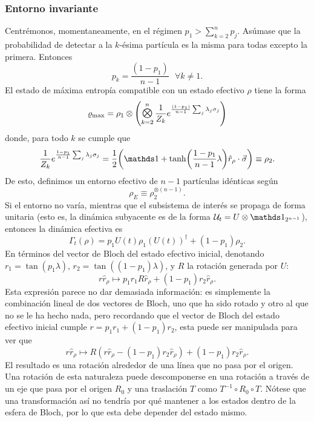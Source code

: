 \subsubsection{Entorno invariante}

Centrémonos, momentaneamente, en el régimen $p_{1}>\sum_{k=2}^{n}p_{j}$. Asúmase que la probabilidad de detectar a la $k$-ésima partícula es la misma para todas excepto la primera. Entonces
\begin{equation*}
    p_{k}=\frac{(1-p_{1})}{n-1}\text{ }\forall k\neq 1.
\end{equation*}
El estado de máxima entropía compatible con un estado efectivo $\rho$ tiene la forma
\begin{equation*}
    \varrho_{\max}=\rho_{1}\otimes\qty(\Motimes_{k=2}^{n}\frac{1}{Z_{k}}e^{\frac{(1-p_{1})}{n-1}\sum_{j}\lambda_{j}\pauli{j}})
\end{equation*}
donde, para todo $k$ se cumple que
\begin{equation*}
    \frac{1}{Z_{k}}e^{\frac{1-p_{1}}{n-1}\sum_{j}\lambda_{j}\pauli{j}}=\frac{1}{2}\qty(\Id+\tanh(\frac{1-p_{1}}{n-1}\lambda)\hat{r}_{\rho}\cdot\vec{\sigma})\equiv \rho_{2}.
\end{equation*}
De esto, definimos un entorno efectivo de $n-1$ partículas idénticas según
\begin{equation*}
    \rho_{E}\equiv\rho_{2}^{\otimes(n-1)}.
\end{equation*}
Si el entorno no varía, mientras que el subsistema de interés se propaga de forma unitaria (esto es, la dinámica subyacente es de la forma $\mcU_{t}=U\otimes\Id_{2^{n-1}}$), entonces la dinámica efectiva es
\begin{equation*}
    \Gamma_{t}(\rho)=p_{1}U(t)\rho_{1}(U(t))^{\dag}+(1-p_{1})\rho_{2}.
\end{equation*}
En términos del vector de Bloch del estado efectivo inicial, denotando $r_{1}=\tan(p_{1}\lambda)$, $r_{2}=\tan((1-p_{1})\lambda)$, y $R$ la rotación generada por $U$:
\begin{equation*}
    r\hat{r}_{\rho}\mapsto p_{1}r_{1}R\hat{r}_{\rho}+(1-p_{1})r_{2}\hat{r}_{\rho}.
\end{equation*}
Esta expresión parece no dar demasiada información: es simplemente la combinación lineal de dos vectores de Bloch, uno que ha sido rotado y otro al que no se le ha hecho nada, pero recordando que el vector de Bloch del estado efectivo inicial cumple $r=p_{1}r_{1}+(1-p_{1})r_{2}$, esta puede ser manipulada para ver que
\begin{equation*}
    r\hat{r}_{\rho}\mapsto R(r\hat{r}_{\rho}-(1-p_{1})r_{2}\hat{r}_{\rho})+(1-p_{1})r_{2}\hat{r}_{\rho}.
\end{equation*}
El resultado es una rotación alrededor de una línea que no pasa por el origen. Una rotación de esta naturaleza puede descomponerse en una rotación a través de un eje que pasa por el origen $R_{0}$ y una traslación $T$ como $T^{-1}\circ R_{0}\circ T$. Nótese que una transformación así no tendría por qué mantener a los estados dentro de la esfera de Bloch, por lo que esta debe depender del estado mismo. 

